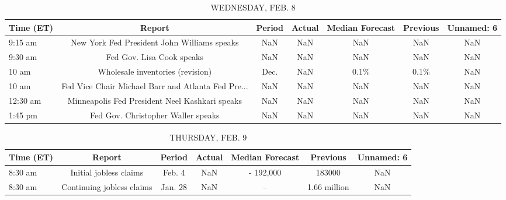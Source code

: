 \documentclass{article}%
\begin{document}
\begin{table}[htbp]%
\caption{WEDNESDAY, FEB. 8}%
\centering%
\begin{adjustbox}{width=1\textwidth}%
\begin{tabular}{lcccccc}
\toprule
Time (ET) &                                             Report & Period & Actual & Median Forecast & Previous & Unnamed: 6 \\
\midrule
  9:15 am &        New York Fed President John Williams speaks &    NaN &    NaN &             NaN &      NaN &        NaN \\
  9:30 am &                          Fed Gov. Lisa Cook speaks &    NaN &    NaN &             NaN &      NaN &        NaN \\
    10 am &                   Wholesale inventories (revision) &   Dec. &    NaN &            0.1\% &     0.1\% &        NaN \\
    10 am & Fed Vice Chair Michael Barr and Atlanta Fed Pre... &    NaN &    NaN &             NaN &      NaN &        NaN \\
 12:30 am &     Minneapolis Fed President Neel Kashkari speaks &    NaN &    NaN &             NaN &      NaN &        NaN \\
  1:45 pm &                 Fed Gov. Christopher Waller speaks &    NaN &    NaN &             NaN &      NaN &        NaN \\
\bottomrule
\end{tabular}
%
\end{adjustbox}%
\end{table}

%


\begin{table}[htbp]%
\caption{THURSDAY, FEB. 9}%
\centering%
\begin{adjustbox}{width=1\textwidth}%
\begin{tabular}{lcccccc}
\toprule
Time (ET) &                    Report &  Period & Actual & Median Forecast &     Previous & Unnamed: 6 \\
\midrule
  8:30 am &    Initial jobless claims &  Feb. 4 &    NaN &       - 192,000 &       183000 &        NaN \\
  8:30 am & Continuing jobless claims & Jan. 28 &    NaN &              -- & 1.66 million &        NaN \\
\bottomrule
\end{tabular}
%
\end{adjustbox}%
\end{table}
\end{document}
